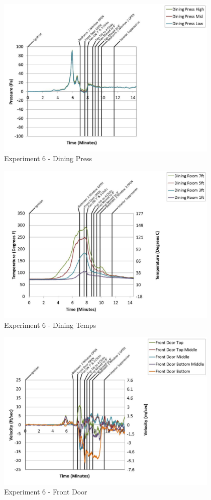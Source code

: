 \documentclass{article}
\begin{document}
\begin{appendices}
	\clearpage

	\begin{figure}[h!]
		\centering
		\includegraphics[height=3.05in]{0_Images/Results_Charts/Exp_6_Charts/DiningPress.pdf}
		\caption{Experiment 6 - Dining Press}
	\end{figure}
 

	\begin{figure}[h!]
		\centering
		\includegraphics[height=3.05in]{0_Images/Results_Charts/Exp_6_Charts/DiningTemps.pdf}
		\caption{Experiment 6 - Dining Temps}
	\end{figure}
 
	\clearpage

	\begin{figure}[h!]
		\centering
		\includegraphics[height=3.05in]{0_Images/Results_Charts/Exp_6_Charts/FrontDoor.pdf}
		\caption{Experiment 6 - Front Door}
	\end{figure}
 


\end{appendices}
\end{document}
